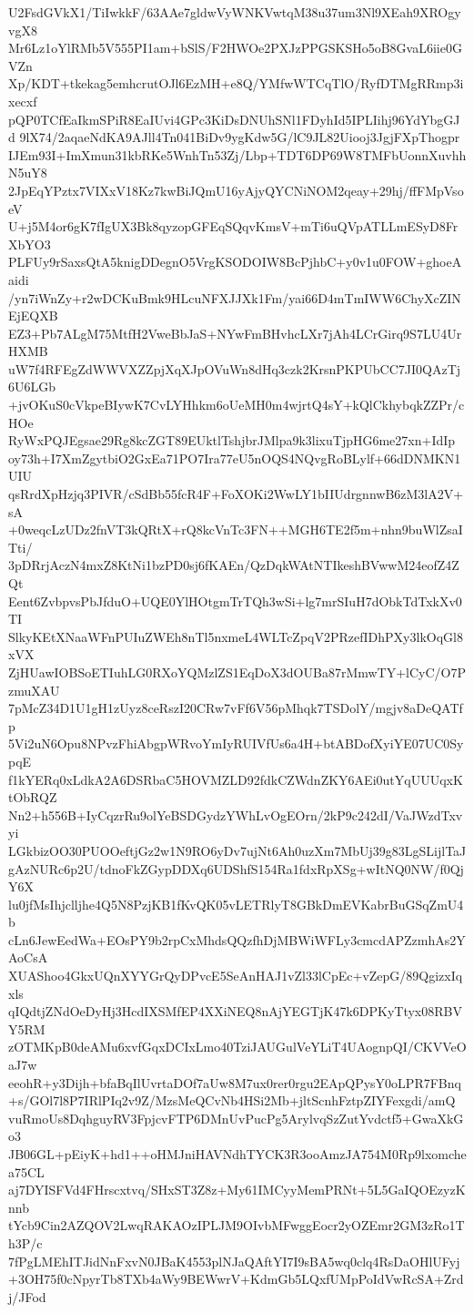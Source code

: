 U2FsdGVkX1/TiIwkkF/63AAe7gldwVyWNKVwtqM38u37um3Nl9XEah9XROgyvgX8
Mr6Lz1oYlRMb5V555PI1am+bSlS/F2HWOe2PXJzPPGSKSHo5oB8GvaL6iie0GVZn
Xp/KDT+tkekag5emhcrutOJl6EzMH+e8Q/YMfwWTCqTlO/RyfDTMgRRmp3ixecxf
pQP0TCfEaIkmSPiR8EaIUvi4GPc3KiDsDNUhSNl1FDyhId5IPLIihj96YdYbgGJd
9lX74/2aqaeNdKA9AJll4Tn041BiDv9ygKdw5G/lC9JL82Uiooj3JgjFXpThogpr
IJEm93I+ImXmun31kbRKe5WnhTn53Zj/Lbp+TDT6DP69W8TMFbUonnXuvhhN5uY8
2JpEqYPztx7VIXxV18Kz7kwBiJQmU16yAjyQYCNiNOM2qeay+29hj/ffFMpVsoeV
U+j5M4or6gK7fIgUX3Bk8qyzopGFEqSQqvKmsV+mTi6uQVpATLLmESyD8FrXbYO3
PLFUy9rSaxsQtA5knigDDegnO5VrgKSODOIW8BcPjhbC+y0v1u0FOW+ghoeAaidi
/yn7iWnZy+r2wDCKuBmk9HLcuNFXJJXk1Fm/yai66D4mTmIWW6ChyXcZINEjEQXB
EZ3+Pb7ALgM75MtfH2VweBbJaS+NYwFmBHvhcLXr7jAh4LCrGirq9S7LU4UrHXMB
uW7f4RFEgZdWWVXZZpjXqXJpOVuWn8dHq3czk2KrsnPKPUbCC7JI0QAzTj6U6LGb
+jvOKuS0cVkpeBIywK7CvLYHhkm6oUeMH0m4wjrtQ4sY+kQlCkhybqkZZPr/cHOe
RyWxPQJEgsae29Rg8kcZGT89EUktlTshjbrJMlpa9k3lixuTjpHG6me27xn+IdIp
oy73h+I7XmZgytbiO2GxEa71PO7Ira77eU5nOQS4NQvgRoBLylf+66dDNMKN1UIU
qsRrdXpHzjq3PIVR/cSdBb55fcR4F+FoXOKi2WwLY1bIIUdrgnnwB6zM3lA2V+sA
+0weqcLzUDz2fnVT3kQRtX+rQ8kcVnTc3FN++MGH6TE2f5m+nhn9buWlZsaITti/
3pDRrjAczN4mxZ8KtNi1bzPD0sj6fKAEn/QzDqkWAtNTIkeshBVwwM24eofZ4ZQt
Eent6ZvbpvsPbJfduO+UQE0YlHOtgmTrTQh3wSi+lg7mrSIuH7dObkTdTxkXv0TI
SlkyKEtXNaaWFnPUIuZWEh8nTl5nxmeL4WLTcZpqV2PRzefIDhPXy3lkOqGl8xVX
ZjHUawIOBSoETIuhLG0RXoYQMzlZS1EqDoX3dOUBa87rMmwTY+lCyC/O7PzmuXAU
7pMcZ34D1U1gH1zUyz8ceRszI20CRw7vFf6V56pMhqk7TSDolY/mgjv8aDeQATfp
5Vi2uN6Opu8NPvzFhiAbgpWRvoYmIyRUIVfUs6a4H+btABDofXyiYE07UC0SypqE
f1kYERq0xLdkA2A6DSRbaC5HOVMZLD92fdkCZWdnZKY6AEi0utYqUUUqxKtObRQZ
Nn2+h556B+IyCqzrRu9olYeBSDGydzYWhLvOgEOrn/2kP9c242dI/VaJWzdTxvyi
LGkbizOO30PUOOeftjGz2w1N9RO6yDv7ujNt6Ah0uzXm7MbUj39g83LgSLijlTaJ
gAzNURc6p2U/tdnoFkZGypDDXq6UDShfS154Ra1fdxRpXSg+wItNQ0NW/f0QjY6X
lu0jfMsIhjclljhe4Q5N8PzjKB1fKvQK05vLETRlyT8GBkDmEVKabrBuGSqZmU4b
cLn6JewEedWa+EOsPY9b2rpCxMhdsQQzfhDjMBWiWFLy3cmcdAPZzmhAs2YAoCsA
XUAShoo4GkxUQnXYYGrQyDPvcE5SeAnHAJ1vZl33lCpEc+vZepG/89QgizxIqxls
qIQdtjZNdOeDyHj3HcdIXSMfEP4XXiNEQ8nAjYEGTjK47k6DPKyTtyx08RBVY5RM
zOTMKpB0deAMu6xvfGqxDCIxLmo40TziJAUGulVeYLiT4UAognpQI/CKVVeOaJ7w
eeohR+y3Dijh+bfaBqIlUvrtaDOf7aUw8M7ux0rer0rgu2EApQPysY0oLPR7FBnq
+s/GOl7l8P7IRlPIq2v9Z/MzsMeQCvNb4HSi2Mb+jltScnhFztpZIYFexgdi/amQ
vuRmoUs8DqhguyRV3FpjcvFTP6DMnUvPucPg5ArylvqSzZutYvdctf5+GwaXkGo3
JB06GL+pEiyK+hd1++oHMJniHAVNdhTYCK3R3ooAmzJA754M0Rp9lxomchea75CL
aj7DYISFVd4FHrscxtvq/SHxST3Z8z+My61IMCyyMemPRNt+5L5GaIQOEzyzKnnb
tYcb9Cin2AZQOV2LwqRAKAOzIPLJM9OIvbMFwggEocr2yOZEmr2GM3zRo1Th3P/c
7fPgLMEhITJidNnFxvN0JBaK4553plNJaQAftYI7I9sBA5wq0clq4RsDaOHlUFyj
+3OH75f0cNpyrTb8TXb4aWy9BEWwrV+KdmGb5LQxfUMpPoIdVwRcSA+Zrdj/JFod
